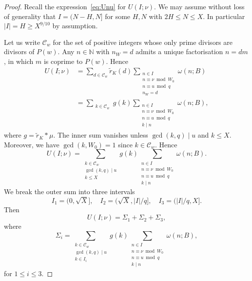 \documentclass[11pt,letterpaper]{amsart}
\renewcommand{\leq}{\leqslant}
\renewcommand{\geq}{\geqslant}
\theoremstyle{definition}
\numberwithin{equation}{section}
\newcommand\NN{\mathbb{N}}
\DeclareMathOperator{\n}{N}
\newcommand{\0}{\mathbf{0}}
\begin{document}
\begin{proof} Recall the expression~\eqref{eq:Unu} for $U(I;\nu)$. We may assume without loss of generality that $I= (N-H,N]$ for some $H,N$ with $2H\leq N\leq X$. In particular $|I|=H\geq X^{9/10}$ by assumption.

Let us  write $\mathcal{C}_w$ for the set of positive integers whose only prime divisors are divisors of $P(w)$.
Any $n\in \NN$ with $n_W=d$ admits a unique  factorisation $n=dm$, in which $m$ is coprime to $ P(w)$. Hence
\begin{align*}
U(I;\nu)
&=\sum_{d\in \mathcal{C}_w} \tilde r_K(d)
\sum_{\substack{n\in I\\ n\equiv \nu\bmod{W_0}\\n\equiv u\bmod{q}\\
n_W=d
}}  \omega(n;B)\\ &=
\sum_{\substack{k\in \mathcal{C}_w}} g(k) 
\sum_{\substack{n\in I
\\ n\equiv \nu\bmod{W_0}\\ n\equiv u\bmod{q}\\
k\mid n}} \omega(n;B),
\end{align*}
where
$
g=\tilde r_K* \mu$. The  inner sum vanishes unless 
$\gcd(k,q)\mid u$ and $k\leq X$.   Moreover, we have $\gcd(k,W_0)=1$ since $k\in \mathcal{C}_w$.
Hence 
$$
U(I;\nu)
=
\sum_{\substack{k\in \mathcal{C}_w\\ \gcd(k,q)\mid u\\ k\leq X}} g(k) 
\sum_{\substack{n\in I\\ n\equiv \nu\bmod{W_0}\\
 n\equiv u\bmod{q}\\
k\mid n}}  \omega(n;B).
$$
We break the outer  sum into three intervals 
$$
I_1=(0,\sqrt{X}], \quad I_2=(\sqrt{X},|I|/q], \quad I_3=(|I|/q,X].
$$
Then 
\begin{equation}\label{eq:sum-sig123}
U(I;\nu)=\Sigma_1+\Sigma_2+\Sigma_3,
\end{equation}
where
$$
\Sigma_i=
\sum_{\substack{k\in \mathcal{C}_w\\ \gcd(k,q)\mid u\\ k\in I_i}} g(k) 	
\sum_{\substack{n\in I
\\ n\equiv \nu\bmod{W_0}\\n\equiv u\bmod{q}\\
k\mid n}}  \omega(n;B),
$$
for $1\leq i\leq 3$. 


\end{proof}
\end{document}
